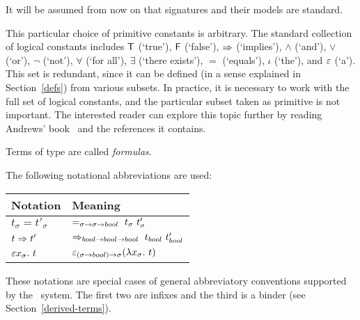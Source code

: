 It will be assumed from now on that signatures and their models are
standard.

\medskip

This particular choice of primitive constants is arbitrary.  The
standard collection of logical constants includes $\mbox{\normalsize\sf T}$ (`true'), $\mbox{\normalsize\sf F}$
(`false'), $\Rightarrow$ (`implies'), $\wedge$ (`and'), $\vee$
(`or'), $\neg$ (`not'), $\forall$ (`for all'), $\exists$ (`there
exists'), $=$ (`equals'), $\iota$ (`the'), and $\varepsilon$ (`a'). This
set is redundant, since it can be defined (in a sense explained in
Section~\ref{defs}) from various subsets. In practice, it is
necessary to work with the full set of logical constants, and the
particular subset taken as primitive is not important. The interested
reader can explore this topic  further by reading Andrews'
book~\cite{Andrews} and the references it contains.

\medskip

Terms of type  are  called {\it formulas\/}.

The following notational abbreviations are used:

\begin{center}
\begin{tabular}{|l|l|}\hline
{\rm Notation} & {\rm Meaning}\\ \hline
$t_{\sigma}=t'_{\sigma}$ &
  $=_{\sigma\fun\sigma\fun\ty{bool}}\ t_{\sigma}\ t'_{\sigma}$\\ \hline
$t\Rightarrow t'$ &
  $\imp_{\ty{bool}\fun\ty{bool}\fun\ty{bool}}\ t_\ty{bool}\
t'_\ty{bool}$\\ \hline
$\varepsilon x_{\sigma}.\ t$ &
  $ \varepsilon_{(\sigma{\to}{\sl bool}){\to}\sigma}
(\lambda x_{\sigma}.\ t)$\\ \hline
\end{tabular}
\end{center}
These notations are special cases of general abbreviatory
conventions supported by the \HOL\ system. The first two are infixes
and the third is a binder (see Section~\ref{derived-terms}).



